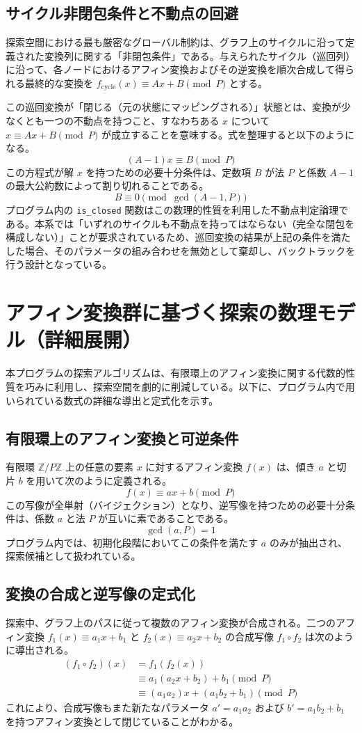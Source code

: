 \documentclass{jsarticle}
\begin{document}
\subsection{サイクル非閉包条件と不動点の回避}
探索空間における最も厳密なグローバル制約は、グラフ上のサイクルに沿って定義された変換列に関する「非閉包条件」である。与えられたサイクル（巡回列）に沿って、各ノードにおけるアフィン変換およびその逆変換を順次合成して得られる最終的な変換を $f_{\text{cycle}}(x) \equiv A x + B \pmod P$ とする。

この巡回変換が「閉じる（元の状態にマッピングされる）」状態とは、変換が少なくとも一つの不動点を持つこと、すなわちある $x$ について $x \equiv A x + B \pmod P$ が成立することを意味する。式を整理すると以下のようになる。
\[
(A - 1)x \equiv B \pmod P
\]
この方程式が解 $x$ を持つための必要十分条件は、定数項 $B$ が法 $P$ と係数 $A - 1$ の最大公約数によって割り切れることである。
\[
B \equiv 0 \pmod{\gcd(A - 1, P)}
\]
プログラム内の \texttt{is\_closed} 関数はこの数理的性質を利用した不動点判定論理である。本系では「いずれのサイクルも不動点を持ってはならない（完全な閉包を構成しない）」ことが要求されているため、巡回変換の結果が上記の条件を満たした場合、そのパラメータの組み合わせを無効として棄却し、バックトラックを行う設計となっている。
\section{アフィン変換群に基づく探索の数理モデル（詳細展開）}

本プログラムの探索アルゴリズムは、有限環上のアフィン変換に関する代数的性質を巧みに利用し、探索空間を劇的に削減している。以下に、プログラム内で用いられている数式の詳細な導出と定式化を示す。

\subsection{有限環上のアフィン変換と可逆条件}
有限環 $\mathbb{Z}/P\mathbb{Z}$ 上の任意の要素 $x$ に対するアフィン変換 $f(x)$ は、傾き $a$ と切片 $b$ を用いて次のように定義される。
\[
f(x) \equiv a x + b \pmod P
\]
この写像が全単射（バイジェクション）となり、逆写像を持つための必要十分条件は、係数 $a$ と法 $P$ が互いに素であることである。
\[
\gcd(a, P) = 1
\]
プログラム内では、初期化段階においてこの条件を満たす $a$ のみが抽出され、探索候補として扱われている。

\subsection{変換の合成と逆写像の定式化}
探索中、グラフ上のパスに従って複数のアフィン変換が合成される。二つのアフィン変換 $f_1(x) \equiv a_1 x + b_1$ と $f_2(x) \equiv a_2 x + b_2$ の合成写像 $f_1 \circ f_2$ は次のように導出される。
\begin{align*}
(f_1 \circ f_2)(x) &= f_1(f_2(x)) \\
&\equiv a_1(a_2 x + b_2) + b_1 \pmod P \\
&\equiv (a_1 a_2)x + (a_1 b_2 + b_1) \pmod P
\end{align*}
これにより、合成写像もまた新たなパラメータ $a' = a_1 a_2$ および $b' = a_1 b_2 + b_1$ を持つアフィン変換として閉じていることがわかる。
\end{document}
